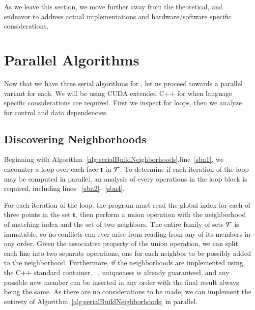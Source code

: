 As we leave this section, we move further away from the theoretical, and endeavor to address actual implementations and hardware/software specific considerations.

%
%
%
%
%
\section{Parallel Algorithms}
Now that we have three serial algorithms for , let us proceed towards a parallel variant for each. We will be using CUDA extended C++ for when language specific considerations are required. First we inspect for loops, then we analyze for control and data dependencies.

\subsection{Discovering Neighborhoods}
Beginning with Algorithm~\ref{alg:serialBuildNeighborhoods},line~\ref{sbn1}, we encounter a loop over each face $\mathbf{t}$ in $\mathcal{T}$. To determine if each iteration of the loop may be computed in parallel, an analysis of every operations in the loop block is required, including lines ~\ref{sbn2}-~\ref{sbn4}. 

For each iteration of the loop, the program must read the global index for each of three points in the set $\mathbf{t}$, then perform a union operation with the neighborhood of matching index and the set of two neighbors. The entire family of sets $\mathcal{T}$ is immutable, so no conflicts can ever arise from reading from any of its members in any order. Given the associative property of the union operation, we can split each line into two separate operations, one for each neighbor to be possibly added to the neighborhood. Furthermore, if the neighborhoods are implemented using the C++ standard container, ~, uniqueness is already guaranteed, and any possible new member can be inserted in any order with the final result always being the same. As there are no considerations to be made, we can implement the entirety of Algorithm~\ref{alg:serialBuildNeighborhoods} in parallel.

